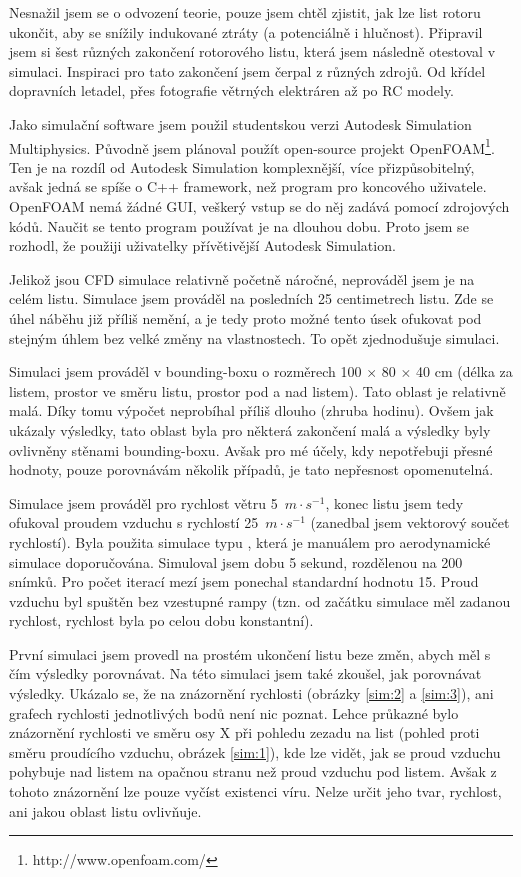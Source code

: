 Nesnažil jsem se o odvození teorie, pouze jsem chtěl zjistit, jak lze list rotoru ukončit, aby se snížily indukované ztráty (a potenciálně i hlučnost). Připravil jsem si šest různých zakončení rotorového listu, která jsem následně otestoval v simulaci. Inspiraci pro tato zakončení jsem čerpal z různých zdrojů. Od křídel dopravních letadel, přes fotografie větrných elektráren až po RC modely.

Jako simulační software jsem použil studentskou verzi Autodesk Simulation Multiphysics. Původně jsem plánoval použít open-source projekt OpenFOAM\footnote{http://www.openfoam.com/}. Ten je na rozdíl od Autodesk Simulation komplexnější, více přizpůsobitelný, avšak jedná se spíše o C++ framework, než program pro koncového uživatele. OpenFOAM nemá žádné GUI, veškerý vstup se do něj zadává pomocí zdrojových kódů. Naučit se tento program používat je na dlouhou dobu. Proto jsem se rozhodl, že použiji uživatelky přívětivější Autodesk Simulation.

Jelikož jsou CFD simulace relativně početně náročné, neprováděl jsem je na celém listu. Simulace jsem prováděl na posledních 25 centimetrech listu. Zde se úhel náběhu již příliš nemění, a je tedy proto možné tento úsek ofukovat pod stejným úhlem bez velké změny na vlastnostech. To opět zjednodušuje simulaci.

Simulaci jsem prováděl v bounding-boxu o rozměrech 100 $\times$ 80 $\times$ 40 cm (délka za listem, prostor ve směru listu, prostor pod a nad listem). Tato oblast je relativně malá. Díky tomu výpočet neprobíhal příliš dlouho (zhruba hodinu). Ovšem jak ukázaly výsledky, tato oblast byla pro některá zakončení malá a výsledky byly ovlivněny stěnami bounding-boxu. Avšak pro mé účely, kdy nepotřebuji přesné hodnoty, pouze porovnávám několik případů, je tato nepřesnost opomenutelná.

Simulace jsem prováděl pro rychlost větru 5~$m\cdot s^{-1}$, konec listu jsem tedy ofukoval proudem vzduchu s rychlostí 25~$m\cdot s^{-1}$ (zanedbal jsem vektorový součet rychlostí). Byla použita simulace typu , která je manuálem pro aerodynamické simulace doporučována. Simuloval jsem dobu 5 sekund, rozdělenou na 200 snímků. Pro počet iterací mezí jsem ponechal standardní hodnotu 15. Proud vzduchu byl spuštěn bez vzestupné rampy (tzn. od začátku simulace měl zadanou rychlost, rychlost byla po celou dobu konstantní).

První simulaci jsem provedl na prostém ukončení listu beze změn, abych měl s čím výsledky porovnávat. Na této simulaci jsem také zkoušel, jak porovnávat výsledky. Ukázalo se, že na znázornění rychlosti (obrázky \ref{sim:2} a \ref{sim:3}), ani grafech rychlosti jednotlivých bodů není nic poznat. Lehce průkazné bylo znázornění rychlosti ve směru osy X při pohledu zezadu na list (pohled proti směru proudícího vzduchu, obrázek \ref{sim:1}), kde lze vidět, jak se proud vzduchu pohybuje nad listem  na opačnou stranu než proud vzduchu pod listem. Avšak z tohoto znázornění lze pouze vyčíst existenci víru. Nelze určit jeho tvar, rychlost, ani jakou oblast listu ovlivňuje.

